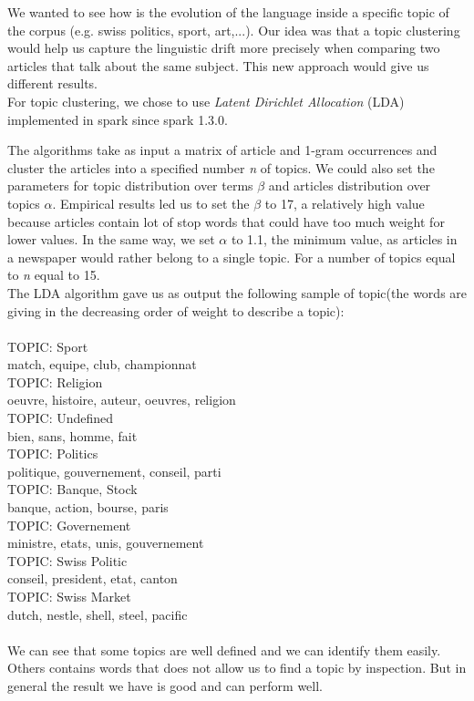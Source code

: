 We wanted to see how is the evolution of the language inside a specific topic of the corpus (e.g. swiss politics, sport, art,...).	
Our idea was that a topic clustering would help us capture the linguistic drift more precisely when comparing two articles that talk about the same subject.
This new approach would give us different results.\\
For topic clustering, we chose to use \emph{Latent Dirichlet Allocation} (LDA) implemented in spark since spark 1.3.0.

The algorithms take as input a matrix of article and 1-gram occurrences and cluster the articles into a specified number \textit{n} of topics. We could also set the parameters for topic distribution over terms $\beta$ and articles distribution over topics $\alpha$. Empirical results led us to set the $\beta$ to 17, a relatively high value because articles contain lot of stop words that could have too much weight for lower values. In the same way, we set $\alpha$ to 1.1, the minimum value, as articles in a newspaper would rather belong to a single topic. For a number of topics equal to \textit{n} equal to 15.\\
The LDA algorithm gave us as output the following sample of topic(the words are giving in the decreasing order of weight to describe a topic):\\
\\
TOPIC: Sport\\
match, equipe, club, championnat\\
TOPIC: Religion\\
oeuvre, histoire, auteur, oeuvres, religion\\
TOPIC: Undefined\\
bien, sans, homme, fait\\
TOPIC: Politics\\
politique, gouvernement, conseil, parti\\
TOPIC: Banque, Stock\\
banque, action, bourse, paris\\
TOPIC: Governement\\
ministre, etats, unis, gouvernement\\
TOPIC: Swiss Politic\\
conseil, president, etat, canton\\
TOPIC: Swiss Market\\
dutch, nestle, shell, steel, pacific\\
\\
We can see that some topics are well defined and we can identify them easily. Others contains words that does not allow us to find a topic by inspection. But in general the result we have is good and can perform well.
